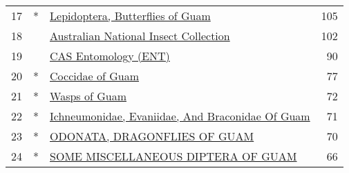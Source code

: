 \begin{longtable}{llp{5in}r}
17 &  * &                                                                                                                                                                 \href{https://www.gbif.org/dataset/9298158c-3c02-4ba2-ab8a-87c7f9c8e70b}{Lepidoptera, Butterflies of Guam} &           105 \\
18 &    &                                                                                                                                                            \href{https://www.gbif.org/dataset/beed1b50-8c73-11dc-aaed-b8a03c50a862}{Australian National Insect Collection} &           102 \\
19 &    &                                                                                                                                                                             \href{https://www.gbif.org/dataset/14f3151a-e95d-493c-a40d-d9938ef62954}{CAS Entomology (ENT)} &            90 \\
20 &  * &                                                                                                                                                                                 \href{https://www.gbif.org/dataset/ddbdc4ea-a921-4961-b58d-4b28fed11e68}{Coccidae of Guam} &            77 \\
21 &  * &                                                                                                                                                                                    \href{https://www.gbif.org/dataset/1df399c6-c920-4862-81a3-dd51f0a28471}{Wasps of Guam} &            72 \\
22 &  * &                                                                                                                                                 \href{https://www.gbif.org/dataset/6e65e7d3-7a72-4da4-9739-5e3814593490}{Ichneumonidae, Evaniidae, And Braconidae Of Guam} &            71 \\
23 &  * &                                                                                                                                                                     \href{https://www.gbif.org/dataset/c9232a85-5a09-440a-9ede-102073e7b6f0}{ODONATA, DRAGONFLIES OF GUAM} &            70 \\
24 &  * &                                                                                                                                                               \href{https://www.gbif.org/dataset/7b960500-f4a3-4b8f-8b56-440fdc9431c9}{SOME MISCELLANEOUS DIPTERA OF GUAM} &            66 \\

\end{longtable}
